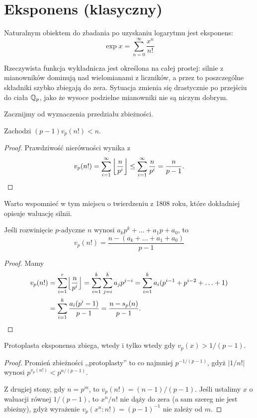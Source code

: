 \section{Eksponens (klasyczny)}
Naturalnym  obiektem do zbadania po uzyskaniu logarytmu jest eksponens:
\[
		\exp x = \sum_{n=0}^\infty \frac{x^n}{n!}
\]

Rzeczywista funkcja wykładnicza jest określona na całej prostej: silnie z mianowników dominują nad wielomianami z liczników, a przez to poszczególne składniki szybko zbiegają do zera.
Sytuacja zmienia się drastycznie po przejściu do ciała $\mathbb Q_p$, jako że wysoce podzielne mianowniki nie są niczym dobrym.

Zacznijmy od wyznaczenia przedziału zbieżności.

\begin{lemat}
	Zachodzi $(p-1) v_p(n!) < n$.
\end{lemat}

\begin{proof}
	Prawdziwość nierówności wynika z
	\[
		v_p(n!) = \sum_{i = 1}^\infty \left \lfloor \frac n {p^i} \right \rfloor \le \sum_{i = 1}^\infty \frac n {p^i} = \frac n {p-1}. \qedhere
	\]
\end{proof}

Warto wspomnieć w tym miejscu o twierdzeniu z 1808 roku, które dokładniej opisuje waluację silnii.

\begin{twierdzenie}[Legendre]
	Jeśli rozwinięcie $p$-adyczne $n$ wynosi $a_k p^k + \ldots + a_1 p + a_0$, to
	\[
		v_p(n!) = \frac{n - (a_k + \ldots + a_1 + a_0)}{p-1}
	\]
\end{twierdzenie}

\begin{proof}
	Mamy
	\begin{align*}
	v_p(n!) & = \sum_{i=1}^r \Bigl \lfloor \frac n{p^i} \Bigr \rfloor = \sum_{i=1}^k \sum_{j=i}^k a_j p^{j-i} = \sum_{i=1}^k a_i(p^{i-1} + p^{i-2}+ \ldots + 1) \\
	& = \sum_{i=1}^k \frac {a_i (p^i-1)}{p-1} = \frac{n - s_p(n)}{p-1}. \qedhere
	\end{align*}
\end{proof}

\begin{lemat}
 	Protoplasta eksponensa zbiega, wtedy i tylko wtedy gdy $v_p(x) > 1 / (p-1)$. 
\end{lemat}

\begin{proof}
	Promień zbieżności ,,protoplasty'' to co najmniej $p^{-1/(p-1)}$, gdyż $|1/n!|$ wynosi $p^{v_p(n!)} < p^{n/(p-1)}$.
	
	Z drugiej stony, gdy $n = p^m$, to $v_p(n!) = (n-1)/(p-1)$.
	Jeśli ustalimy $x$ o waluacji równej $1 / (p-1)$, to $x^n/n!$ nie dąży do zera (a sam szereg nie jest zbieżny), gdyż wyrażenie $v_p(x^n : n!) = (p-1)^{-1}$ nie zależy od $m$.
\end{proof}

